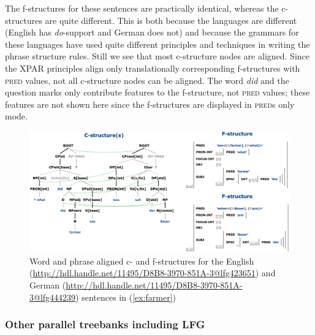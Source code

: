 \documentclass[output=paper,hidelinks]{langscibook}
\begin{document}
\eal \label{ex:farmer}
\zl

The f-structures for these sentences are practically identical, whereas the c-structures are quite different.
This is both because the languages are different (English has \textit{do}-support and German does not) and because the grammars for these languages have used quite different principles and techniques in writing the phrase structure rules.
Still we see that most c-structure nodes are aligned.
Since the XPAR principles align only translationally corresponding f-structures with \textsc{pred} values, not all c-structure nodes can be aligned.
The word \textit{did} and the question marks only contribute features to the f-structure, not \textsc{pred} values; these features are not shown here since the f-structures are displayed in \textsc{pred}s only mode.

\begin{figure}
    \includegraphics[width=\textwidth]{figures/Treebanks/did.png}
    \caption{Word and phrase aligned c- and f-structures for the English (\url{http://hdl.handle.net/11495/D8B8-3970-851A-3@lfg423651}) and German (\url{http://hdl.handle.net/11495/D8B8-3970-851A-3@lfg444239}) sentences in (\ref{ex:farmer})}
    \label{fig:do-support}
\end{figure}


\subsubsection{Other parallel treebanks including LFG}\label{other} %
\end{document}
